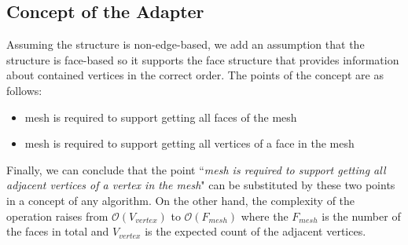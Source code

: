 \subsection{Concept of the Adapter}

Assuming the structure is non-edge-based, we add an assumption that the structure is face-based
so it supports the face structure that provides information about contained vertices in the correct
order. The points of the concept are as follows:

\begin{itemize}
\item mesh is required to support getting all faces of the mesh
\item mesh is required to support getting all vertices of a face in the mesh
\end{itemize}
Finally, we can conclude that the point ``\emph{mesh is required to support getting all adjacent vertices
of a vertex in the mesh}" can be substituted by these two points in a concept of any 
algorithm. On the other hand, the complexity of the operation raises from 
$\mathcal{O}(V_{vertex})$ to $\mathcal{O}(F_{mesh})$ where the $F_{mesh}$ is the number of the
faces in total and $V_{vertex}$ is the expected count of the adjacent vertices.